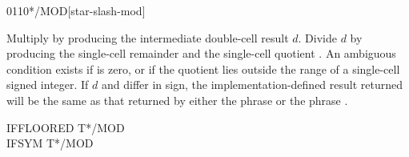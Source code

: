 \pagebreak
\begin{worddef}{0110}{*/MOD}[star-slash-mod]
\item {}

	Multiply  by  producing the intermediate
	double-cell result $d$. Divide $d$ by  producing the
	single-cell remainder  and the single-cell quotient
	. An ambiguous condition exists if  is
	zero, or if the quotient  lies outside the range of a
	single-cell signed integer. If $d$ and  differ in
	sign, the implementation-defined result returned will be the
	same as that returned by either the phrase
	    or the phrase
	   .


	\begin{testing} %
		\ttfamily
		IFFLOORED \tab	\word{:} T*/MOD     \word{;} \\
		IFSYM \tab[2.8]	\word{:} T*/MOD     \word{;}


\end{testing}
\end{worddef}
